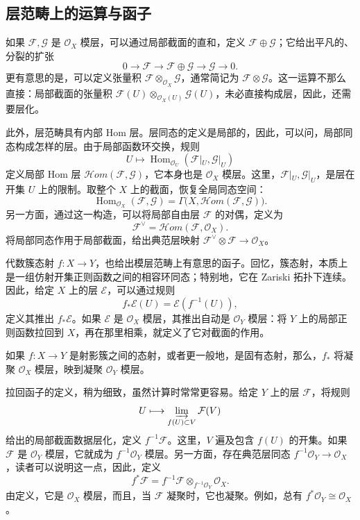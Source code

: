\subsection{层范畴上的运算与函子}\label{sec:4.3.4}

如果 $\mathcal{F},\mathcal{G}$ 是 $\mathcal{O}_X$ 模层，可以通过局部截面的直和，定义 $\mathcal{F}\oplus\mathcal{G}$；它给出平凡的、分裂的扩张
\[
0\longrightarrow\mathcal{F}\longrightarrow\mathcal{F}\oplus\mathcal{G}
\longrightarrow\mathcal{G}\longrightarrow0.
\]
更有意思的是，可以定义张量积 $\mathcal{F}\otimes_{\mathcal{O}_X}\mathcal{G}$，通常简记为 $\mathcal{F}\otimes\mathcal{G}$。这一运算不那么直接：局部截面的张量积 $\mathcal{F}(U)\otimes_{\mathcal{O}_X(U)}\mathcal{G}(U)$，未必直接构成层，因此，还需要层化。

此外，层范畴具有内部 Hom 层。层同态的定义是局部的，因此，可以问，局部同态构成怎样的层。由于局部函数环交换，规则
\[
U\longmapsto
\operatorname{Hom}_{\mathcal{O}_U}(\mathcal{F}|_U,\mathcal{G}|_U)
\]
定义局部 Hom 层 $\mathcal{H}om(\mathcal{F},\mathcal{G})$，它本身也是 $\mathcal{O}_X$ 模层。这里，$\mathcal{F}|_U,\mathcal{G}|_U$，是层在开集 $U$ 上的限制。取整个 $X$ 上的截面，恢复全局同态空间：
\[
\operatorname{Hom}_{\mathcal{O}_X}(\mathcal{F},\mathcal{G})
=\Gamma\bigl(X,\mathcal{H}om(\mathcal{F},\mathcal{G})\bigr).
\]
另一方面，通过这一构造，可以将局部自由层 $\mathcal{F}$ 的对偶，定义为
\[
\mathcal{F}^{\vee}=\mathcal{H}om(\mathcal{F},\mathcal{O}_X).
\]
将局部同态作用于局部截面，给出典范层映射 $\mathcal{F}^{\vee}\otimes\mathcal{F}\to\mathcal{O}_X$。

代数簇态射 $f\colon X\to Y$，也给出模层范畴上有意思的函子。回忆，簇态射，本质上是一组仿射开集正则函数之间的相容环同态；特别地，它在 Zariski 拓扑下连续。因此，给定 $X$ 上的层 $\mathcal{E}$，可以通过规则
\[
f_*\mathcal{E}(U)=\mathcal{E}(f^{-1}(U)),
\]
定义其推出 $f_*\mathcal{E}$。如果 $\mathcal{E}$ 是 $\mathcal{O}_X$ 模层，其推出自动是 $\mathcal{O}_Y$ 模层：将 $Y$ 上的局部正则函数拉回到 $X$，再在那里相乘，就定义了它对截面的作用。

\begin{proposition}\label{prop:4.43}
如果 $f\colon X\to Y$ 是射影簇之间的态射，或者更一般地，是固有态射，那么，$f_*$ 将凝聚 $\mathcal{O}_X$ 模层，映到凝聚 $\mathcal{O}_Y$ 模层。
\end{proposition}

拉回函子的定义，稍为细致，虽然计算时常常更容易。给定 $Y$ 上的层 $\mathcal{F}$，将规则
\[
U\longmapsto\varinjlim_{f(U)\subset V}\mathcal{F}(V)
\]
给出的局部截面数据层化，定义 $f^{-1}\mathcal{F}$。这里，$V$ 遍及包含 $f(U)$ 的开集。如果 $\mathcal{F}$ 是 $\mathcal{O}_Y$ 模层，它就成为 $f^{-1}\mathcal{O}_Y$ 模层。另一方面，存在典范层同态 $f^{-1}\mathcal{O}_Y\to\mathcal{O}_X$，读者可以说明这一点，因此，定义
\[
f^*\mathcal{F}
=f^{-1}\mathcal{F}\otimes_{f^{-1}\mathcal{O}_Y}\mathcal{O}_X.
\]
由定义，它是 $\mathcal{O}_X$ 模层，而且，当 $\mathcal{F}$ 凝聚时，它也凝聚。例如，总有 $f^*\mathcal{O}_Y\cong\mathcal{O}_X$。

